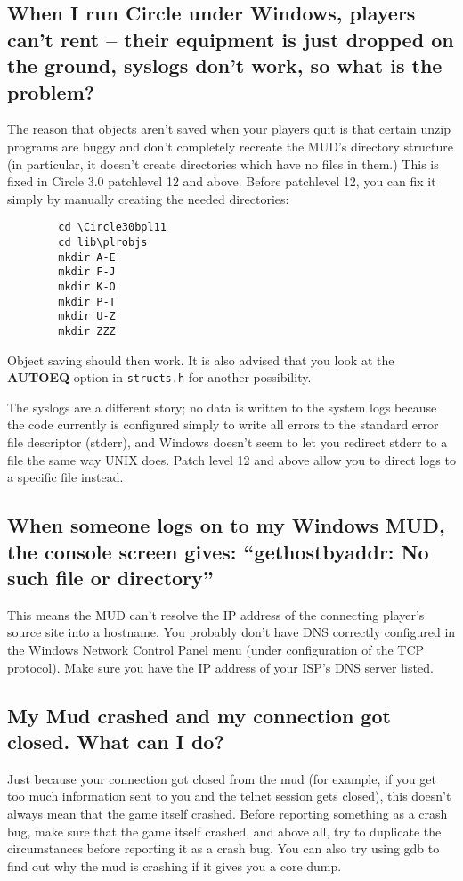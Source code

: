\documentclass[11pt]{article}
\begin{document}
\subsection{When I run Circle under Windows, players can't rent -- their equipment is just dropped on the ground, syslogs don't work, so what is the problem?}
The reason that objects aren't saved when your players quit is that certain unzip programs are buggy and don't completely recreate the MUD's directory structure (in particular, it doesn't create directories which have no files in them.)  This is fixed in Circle 3.0 patchlevel 12 and above.  Before patchlevel 12, you can fix it simply by manually creating the needed directories:
\begin{verbatim}
        cd \Circle30bpl11
        cd lib\plrobjs
        mkdir A-E
        mkdir F-J
        mkdir K-O
        mkdir P-T
        mkdir U-Z
        mkdir ZZZ
\end{verbatim}
Object saving should then work.  It is also advised that you look at the {\bf AUTOEQ} option in \texttt{structs.h} for another possibility.
\par
The syslogs are a different story; no data is written to the system logs because the code currently is configured simply to write all errors to the standard error file
descriptor (stderr), and Windows doesn't seem to let you redirect stderr to a file the same way UNIX does.  Patch level 12 and above allow you to direct logs to a specific file instead.

\subsection{When someone logs on to my Windows MUD, the console screen gives: ``gethostbyaddr: No such file or directory''}
This means the MUD can't resolve the IP address of the connecting player's source site into a hostname.  You probably don't have DNS correctly configured in the Windows Network Control Panel menu (under configuration of the TCP protocol).  Make sure you have the IP address of your ISP's DNS server listed.

\subsection{My Mud crashed and my connection got closed.  What can I do?}
Just because your connection got closed from the mud (for example, if you get too much information sent to you and the telnet session gets closed), this doesn't always mean that the game itself crashed.  Before reporting something as a crash bug, make sure that the game itself crashed, and above all, try to duplicate the circumstances before reporting it as a crash bug.  You can also try using gdb to find out why the mud is crashing if it gives you a core dump.
\end{document}
